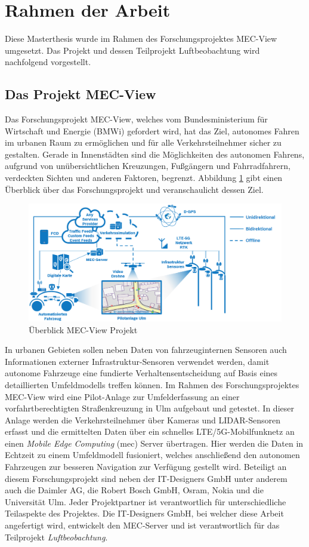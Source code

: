 \section{Rahmen der Arbeit}
\label{sec:rahmen_arbeit}

Diese Masterthesis wurde im Rahmen des Forschungsprojektes MEC-View umgesetzt. Das Projekt und dessen
Teilprojekt Luftbeobachtung wird nachfolgend vorgestellt.

\subsection{Das Projekt MEC-View}
\label{sec:mec_view}

Das Forschungsprojekt MEC-View, welches vom Bundesministerium für Wirtschaft und Energie (BMWi) gefordert wird,
hat das Ziel, autonomes Fahren im urbanen Raum zu ermöglichen und für alle Verkehrsteilnehmer sicher zu gestalten.
Gerade in Innenstädten sind die Möglichkeiten des autonomen Fahrens, aufgrund von unübersichtlichen Kreuzungen,
Fußgängern und Fahrradfahrern, verdeckten Sichten und anderen Faktoren, begrenzt.
Abbildung \ref{fig:intro_mec_view_arch} gibt einen Überblick über das Forschungsprojekt und veranschaulicht dessen Ziel.

\begin{figure}[H]
\centering
    \includegraphics[width=0.7\linewidth]{resources/img/mec_view_arch}
\caption[Überblick MEC-View Projekt]{Überblick MEC-View Projekt \cite[]{mecViewWeb}}
\label{fig:intro_mec_view_arch}
\end{figure}

In urbanen Gebieten
sollen neben Daten von fahrzeuginternen Sensoren auch Informationen externer Infrastruktur-Sensoren verwendet werden,
damit autonome Fahrzeuge eine fundierte Verhaltensentscheidung auf Basis eines detaillierten Umfeldmodells treffen können.
Im Rahmen des Forschungsprojektes MEC-View wird eine Pilot-Anlage zur Umfelderfassung an einer vorfahrtberechtigten Straßenkreuzung
in Ulm aufgebaut und getestet. In dieser Anlage werden die Verkehrsteilnehmer über Kameras und LIDAR-Sensoren erfasst
und die ermittelten Daten über ein schnelles LTE/5G-Mobilfunknetz an einen \textit{Mobile Edge Computing} (\acrshort*{mec}) Server übertragen.
Hier werden die Daten in Echtzeit zu einem Umfeldmodell fusioniert, welches anschließend den autonomen Fahrzeugen
zur besseren Navigation zur Verfügung gestellt wird. Beteiligt an diesem Forschungsprojekt sind neben
der IT-Designers GmbH unter anderem auch die Daimler AG, die Robert Bosch GmbH, Osram, Nokia und die Universität Ulm.
Jeder Projektpartner ist verantwortlich für unterschiedliche Teilaspekte des Projektes. Die IT-Designers GmbH,
bei welcher diese Arbeit angefertigt wird, entwickelt den MEC-Server und ist verantwortlich für das
Teilprojekt \textit{Luftbeobachtung}. \cite[]{mecViewWeb}

